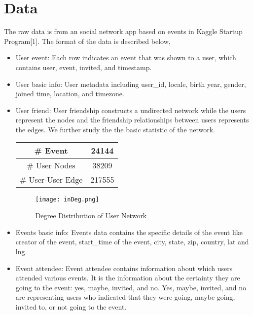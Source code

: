 \documentclass{article}
\begin{document}
\section{Data}
The raw data is from an social network app based on events in Kaggle Startup Program[1]. The format of the data is described below, 
\begin{itemize}
\item User event: Each row indicates an event that was shown to a user, which contains user, event, invited, and timestamp.

\item User basic info: User metadata including user\_id, locale, birth year, gender, joined time, location, and timezone.

\item User friend: User friendship constructs a undirected network while the users represent the nodes and the friendship relationships between users represents the edges. We further study the the basic statistic of the network.
\begin{center}

\begin{tabular}{|c|c|}
\hline
\# Event&24144 \\ \hline
\# User Nodes&38209 \\ \hline
\# User-User Edge&217555 \\ \hline
\end{tabular}
\end{center}

\begin{figure}[h]
\begin{center}
\texttt{[image: inDeg.png]}
\caption{Degree Distribution of User Network}
\label{fig:degdis}
\end{center}
\end{figure}



\item Events basic info: Events data contains the specific details of the event like creator of the event, start\_time of the event, city, state, zip, country, lat and lng.

\item Event attendee: Event attendee contains information about which users attended various events. It is the information about the certainty they are going to the event: yes, maybe, invited, and no. Yes, maybe, invited, and no are representing users who indicated that they were going, maybe going, invited to, or not going to the event.
\end{itemize}
\end{document}
